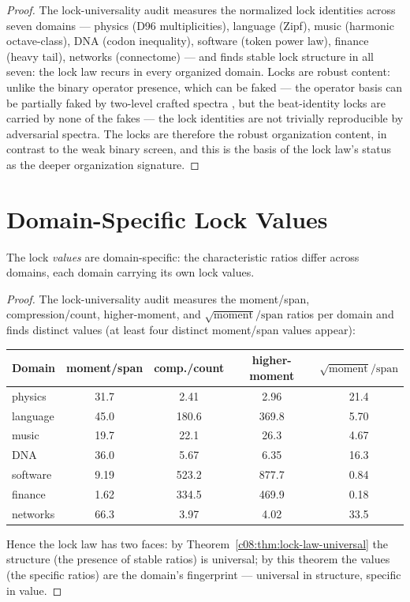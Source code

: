 \begin{proof}
The lock-universality audit \cite{c08:QG313} measures the normalized lock identities across
seven domains --- physics (D96 multiplicities), language (Zipf), music (harmonic
octave-class), DNA (codon inequality), software (token power law), finance (heavy tail),
networks (connectome) --- and finds stable lock structure in all seven: the lock law recurs
in every organized domain. Locks are robust content: unlike the binary operator presence,
which can be faked --- the operator basis can be partially faked by two-level crafted
spectra \cite{c08:QG312}, but the beat-identity locks are carried by none of the fakes ---
the lock identities are not trivially reproducible by adversarial spectra. The locks are
therefore the robust organization content, in contrast to the weak binary screen, and this
is the basis of the lock law's status as the deeper organization signature.
\end{proof}

\section{Domain-Specific Lock Values}
\label{c08:sec:domain-values}

\begin{theorem}
\label{c08:thm:lock-values-domain}
The lock \emph{values} are domain-specific: the characteristic ratios differ across domains,
each domain carrying its own lock values.
\end{theorem}

\begin{proof}
The lock-universality audit \cite{c08:QG313} measures the moment/span, compression/count,
higher-moment, and $\sqrt{\text{moment}}/\text{span}$ ratios per domain and finds distinct
values (at least four distinct moment/span values appear):
\begin{center}
\begin{tabular}{lcccc}
\hline
Domain & moment/span & comp./count & higher-moment & $\sqrt{\text{moment}}/\text{span}$ \\
\hline
physics & 31.7 & 2.41 & 2.96 & 21.4 \\
language & 45.0 & 180.6 & 369.8 & 5.70 \\
music & 19.7 & 22.1 & 26.3 & 4.67 \\
DNA & 36.0 & 5.67 & 6.35 & 16.3 \\
software & 9.19 & 523.2 & 877.7 & 0.84 \\
finance & 1.62 & 334.5 & 469.9 & 0.18 \\
networks & 66.3 & 3.97 & 4.02 & 33.5 \\
\hline
\end{tabular}
\end{center}
Hence the lock law has two faces: by Theorem~\ref{c08:thm:lock-law-universal} the structure
(the presence of stable ratios) is universal; by this theorem the values (the specific
ratios) are the domain's fingerprint --- universal in structure, specific in value.
\end{proof}

